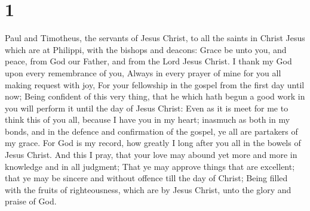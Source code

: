 \hypertarget{section}{%
\section{1}\label{section}}

 Paul and Timotheus, the servants of Jesus Christ, to all
the saints in Christ Jesus which are at Philippi, with the bishops and
deacons:  Grace be unto you, and peace, from God our Father,
and from the Lord Jesus Christ.  I thank my God upon every
remembrance of you,  Always in every prayer of mine for you
all making request with joy,  For your fellowship in the
gospel from the first day until now;  Being confident of
this very thing, that he which hath begun a good work in you will
perform it until the day of Jesus Christ:  Even as it is
meet for me to think this of you all, because I have you in my heart;
inasmuch as both in my bonds, and in the defence and confirmation of the
gospel, ye all are partakers of my grace.  For God is my
record, how greatly I long after you all in the bowels of Jesus Christ.
 And this I pray, that your love may abound yet more and
more in knowledge and in all judgment;  That ye may approve
things that are excellent; that ye may be sincere and without offence
till the day of Christ;  Being filled with the fruits of
righteousness, which are by Jesus Christ, unto the glory and praise of
God.

